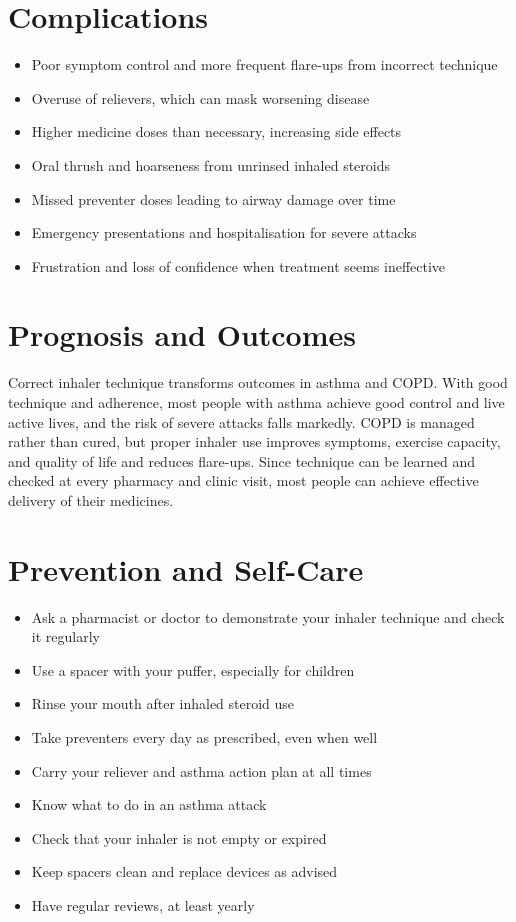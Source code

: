\section*{Complications}
\begin{itemize}
    \item Poor symptom control and more frequent flare-ups from incorrect technique
    \item Overuse of relievers, which can mask worsening disease
    \item Higher medicine doses than necessary, increasing side effects
    \item Oral thrush and hoarseness from unrinsed inhaled steroids
    \item Missed preventer doses leading to airway damage over time
    \item Emergency presentations and hospitalisation for severe attacks
    \item Frustration and loss of confidence when treatment seems ineffective
\end{itemize}

\section*{Prognosis and Outcomes}
Correct inhaler technique transforms outcomes in asthma and COPD. With good technique and adherence, most people with asthma achieve good control and live active lives, and the risk of severe attacks falls markedly. COPD is managed rather than cured, but proper inhaler use improves symptoms, exercise capacity, and quality of life and reduces flare-ups. Since technique can be learned and checked at every pharmacy and clinic visit, most people can achieve effective delivery of their medicines.

\section*{Prevention and Self-Care}
\begin{itemize}
    \item Ask a pharmacist or doctor to demonstrate your inhaler technique and check it regularly
    \item Use a spacer with your puffer, especially for children
    \item Rinse your mouth after inhaled steroid use
    \item Take preventers every day as prescribed, even when well
    \item Carry your reliever and asthma action plan at all times
    \item Know what to do in an asthma attack
    \item Check that your inhaler is not empty or expired
    \item Keep spacers clean and replace devices as advised
    \item Have regular reviews, at least yearly
\end{itemize}

